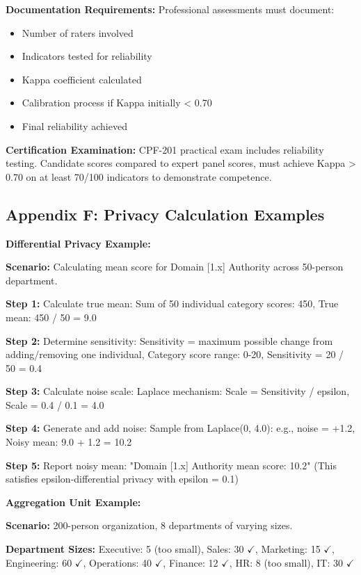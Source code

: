 \documentclass[11pt,a4paper]{article}
\begin{document}
\textbf{Documentation Requirements:}
Professional assessments must document:
\begin{itemize}
\item Number of raters involved
\item Indicators tested for reliability
\item Kappa coefficient calculated
\item Calibration process if Kappa initially < 0.70
\item Final reliability achieved
\end{itemize}

\textbf{Certification Examination:} CPF-201 practical exam includes reliability testing. Candidate scores compared to expert panel scores, must achieve Kappa > 0.70 on at least 70/100 indicators to demonstrate competence.

\subsection{Appendix F: Privacy Calculation Examples}

\textbf{Differential Privacy Example:}

\textbf{Scenario:} Calculating mean score for Domain [1.x] Authority across 50-person department.

\textbf{Step 1:} Calculate true mean: Sum of 50 individual category scores: 450, True mean: 450 / 50 = 9.0

\textbf{Step 2:} Determine sensitivity: Sensitivity = maximum possible change from adding/removing one individual, Category score range: 0-20, Sensitivity = 20 / 50 = 0.4

\textbf{Step 3:} Calculate noise scale: Laplace mechanism: Scale = Sensitivity / epsilon, Scale = 0.4 / 0.1 = 4.0

\textbf{Step 4:} Generate and add noise: Sample from Laplace(0, 4.0): e.g., noise = +1.2, Noisy mean: 9.0 + 1.2 = 10.2

\textbf{Step 5:} Report noisy mean: "Domain [1.x] Authority mean score: 10.2" (This satisfies epsilon-differential privacy with epsilon = 0.1)

\textbf{Aggregation Unit Example:}

\textbf{Scenario:} 200-person organization, 8 departments of varying sizes.

\textbf{Department Sizes:} Executive: 5 (too small), Sales: 30 $\checkmark$, Marketing: 15 $\checkmark$, Engineering: 60 $\checkmark$, Operations: 40 $\checkmark$, Finance: 12 $\checkmark$, HR: 8 (too small), IT: 30 $\checkmark$
\end{document}

